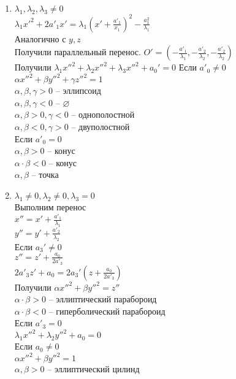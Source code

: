 \documentclass[12pt]{article}
\begin{document}
\begin{enumerate}
    \item $\lambda_1, \lambda_2, \lambda_3 \neq 0$\\
    $\lambda_1 x'^2 + 2a'_1 x' = \lambda_1(x' + \frac{a'_1}{x_1})^2 - \frac{a_1^2}{\lambda_1}$\\
    Аналогично с $y,z$\\
    Получили параллельный перенос. $O' = (-\frac{a'_1}{\lambda_1}, -\frac{a'_2}{\lambda_2}, -\frac{a'_2}{\lambda_2})$\\
    Получили $\lambda_1x''^2 + \lambda_2x''^2 + \lambda_3x''^2 + a_0' = 0$
    Если $a'_0 \neq 0$\\
    $\alpha x''^2 + \beta y''^2 + \gamma z''^2 = 1$\\
    $\alpha, \beta, \gamma > 0$ -- эллипсоид\\
    $\alpha, \beta, \gamma < 0$ -- $\varnothing$\\
    $\alpha, \beta > 0, \gamma < 0$ -- однополостной\\
    $\alpha, \beta < 0, \gamma > 0$ -- двуполостной\\
    Если $a'_0 = 0$\\
    $\alpha, \beta > 0$ -- конус\\
    $\alpha\cdot\beta < 0$ -- конус\\
    $\alpha, \beta$ -- точка
    \item $\lambda_1 \neq 0, \lambda_2 \neq 0, \lambda_3 = 0$\\
    Выполним перенос\\
    $x'' = x' + \frac{a'_1}{\lambda_1}$\\
    $y'' = y' + \frac{a'_2}{\lambda_2}$\\
    Если $a_3' \neq 0$\\
    $z'' = z' + \frac{a_0}{2a'_3}$\\
    $2a'_3z' + a_0 = 2a_3'(z + \frac{a_0}{2a'_3})$\\
    Получили $\alpha x''^2 + \beta y''^2 = z''$\\
    $\alpha\cdot\beta > 0$ -- эллиптический парабороид\\
    $\alpha\cdot\beta < 0$ -- гиперболический парабороид\\
    Если $a'_3 = 0$\\
    $\lambda_1 x''^2 + \lambda_2 y''^2 + a_0 = 0$\\
    Если $a_0 \neq 0$\\
    $\alpha x''^2 + \beta y''^2 = 1$\\
    $\alpha, \beta > 0$ -- эллиптический цилинд\\

\end{enumerate}
\end{document}
